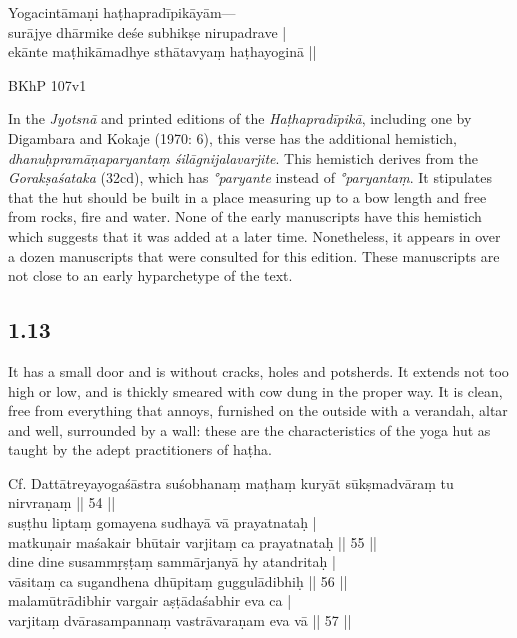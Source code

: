 \begin{ekdosis}
\begin{testimonia}[hp01_012]
Yogacintāmaṇi
\startverse
haṭhapradīpikāyām—\\
surājye dhārmike deśe subhikṣe nirupadrave |\\
ekānte maṭhikāmadhye sthātavyaṃ haṭhayoginā ||
\endverse

BKhP 107v1
\end{testimonia}

\begin{philcomm}[hp01_012]        
In the \emph{Jyotsnā} and printed editions of the \emph{Haṭhapradīpikā}, including one by Digambara and Kokaje (1970: 6), this verse has the additional hemistich, \emph{dhanuḥpramāṇaparyantaṃ śilāgnijalavarjite}. This hemistich derives from the \emph{Gorakṣaśataka} (32cd), which has \emph{°paryante} instead of \emph{°paryantaṃ}. It stipulates that the hut should be built in a place measuring up to a bow length and free from rocks, fire and water. None of the early manuscripts have this hemistich which suggests that it was added at a later time. Nonetheless, it appears in over a dozen manuscripts that were consulted for this edition. These manuscripts are not close to an early hyparchetype of the text.
\end{philcomm}

\subsection*{1.13}
\begin{translation}[hp01_013]
It has a small door and is without cracks, holes and potsherds. It extends not too high or low, and is thickly smeared with cow dung in the proper way. It is clean, free from everything that annoys, furnished on the outside with a verandah, altar and well, surrounded by a wall: these are the characteristics of the yoga hut as taught by the adept practitioners of haṭha.
\end{translation}

\begin{sources}[hp01_013]
Cf. Dattātreyayogaśāstra
\startverse
suśobhanaṃ maṭhaṃ kuryāt sūkṣmadvāraṃ tu nirvraṇaṃ || 54 ||\\
suṣṭhu liptaṃ gomayena sudhayā vā prayatnataḥ |\\
matkuṇair maśakair bhūtair varjitaṃ ca prayatnataḥ || 55 ||\\
dine dine susammṛṣṭaṃ sammārjanyā hy atandritaḥ |\\
vāsitaṃ ca sugandhena dhūpitaṃ guggulādibhiḥ || 56 ||\\
malamūtrādibhir vargair aṣṭādaśabhir eva ca |\\
varjitaṃ dvārasampannaṃ vastrāvaraṇam eva vā || 57 ||
\endverse


\end{sources}
\end{ekdosis}

